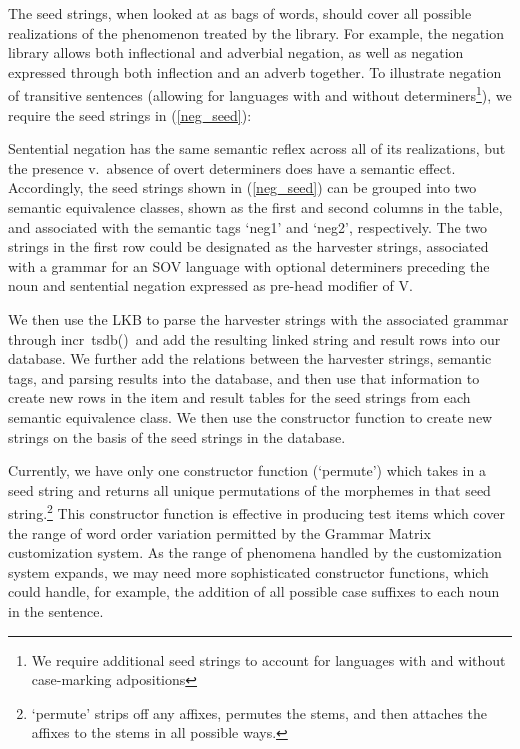 \documentclass[11pt]{article}
\newcommand{\itsdb}{\mbox{\sf \lbrack incr tsdb()\rbrack}}
\begin{document}
The seed strings, when looked at as bags of words, should cover all
possible realizations of the phenomenon treated by the library. For
example, the negation library allows both inflectional and adverbial
negation, as well as negation expressed through both inflection and an
adverb together.  To illustrate negation of transitive sentences
(allowing for languages with and without determiners\footnote{We
require additional seed strings to account for languages with and
without case-marking adpositions}), we require the seed strings in
(\ref{neg_seed}):

%
Sentential negation has the same semantic reflex across all
of its realizations, but the presence v.\ absence of overt determiners
does have a semantic effect.  Accordingly, the seed strings shown in
(\ref{neg_seed}) can be grouped into two semantic equivalence classes,
shown as the first and second columns in the table, and associated with
the semantic tags `neg1' and `neg2', respectively.  The two strings
in the first row could be designated as the harvester strings, associated
with a grammar for an SOV language with optional determiners preceding
the noun and sentential negation expressed as pre-head modifier of V.

We then use the LKB to parse the harvester strings with the associated
grammar through \itsdb\ and add the resulting linked string and 
result rows into our database.  We further add the relations between the
harvester strings, semantic tags, and parsing results into the database,
and then use that information to create new rows in the item and result tables
for the seed strings from each semantic equivalence class.   We then
use the constructor function to create new strings on the basis of
the seed strings in the database. 

Currently, we have only one constructor function (`permute') which
takes in a seed string and returns all unique permutations of the
morphemes in that seed string.\footnote{`permute' strips off any
affixes, permutes the stems, and then attaches the affixes to the
stems in all possible ways.}  This constructor function is effective
in producing test items which cover the range of word order variation
permitted by the Grammar Matrix customization system.  As the range of
phenomena handled by the customization system expands, we may need
more sophisticated constructor functions, which could handle, for
example, the addition of all possible case suffixes to each noun
in the sentence.
\end{document}
